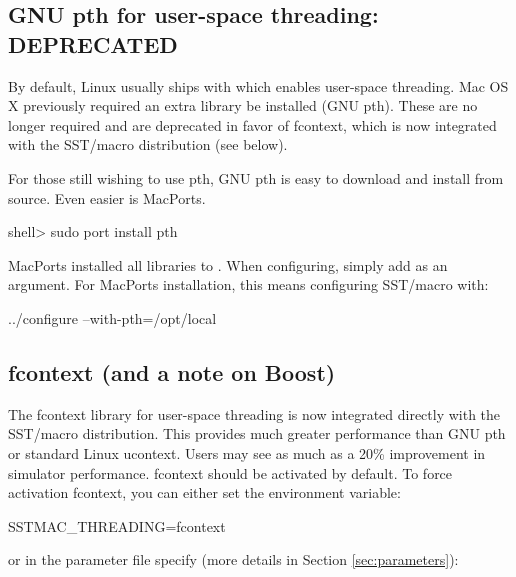 
\subsection{GNU pth for user-space threading: DEPRECATED}\label{subsubsec:pth}
By default, Linux usually ships with  which enables user-space threading.
Mac OS X previously required an extra library be installed (GNU pth).
These are no longer required and are deprecated in favor of fcontext,
which is now integrated with the SST/macro distribution (see below).

For those still wishing to use pth, GNU pth is easy to download and install from source.
Even easier is MacPorts. 

\begin{ShellCmd}
shell> sudo port install pth
\end{ShellCmd}

MacPorts installed all libraries to . 
When configuring, simply add  as an argument.
For MacPorts installation, this means configuring SST/macro with:

\begin{ShellCmd}
../configure --with-pth=/opt/local
\end{ShellCmd}

\subsection{fcontext (and a note on Boost)}\label{subsubsec:boost}
The fcontext library for user-space threading is now integrated directly with the SST/macro distribution.
This provides much greater performance than GNU pth or standard Linux ucontext.
Users may see as much as a 20\% improvement in simulator performance.
fcontext should be activated by default. To force activation fcontext, you can either set the environment variable:

\begin{ShellCmd}
SSTMAC_THREADING=fcontext
\end{ShellCmd}
or in the parameter file specify (more details in Section \ref{sec:parameters}):

